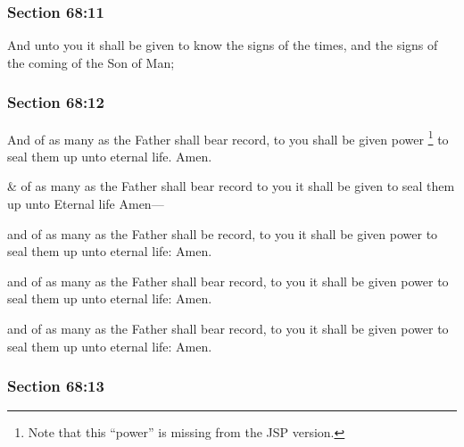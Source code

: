 	\subsubsection{Section 68:11} %
		\label{DC68-11}

		And unto you it shall be given to know the signs of the times, and the signs of the coming of the Son of Man;


	\subsubsection{Section 68:12} %
		\label{DC68-12}

		And of as many as the Father shall bear record, to you shall be given power%
			\footnote{%
				Note that this ``power'' is missing from the JSP version.
				}
		to seal them up unto eternal life.  Amen.

		\begin{framed}
		\scriptsize
			\begin{compactdesc}
				\item[JSP] \& of as many as the Father shall bear record to you it shall be given to seal them up unto Eternal life Amen---
				\item[EMS] and of as many as the Father shall be record, to you it shall be given power to seal them up unto eternal life: Amen.
				\item[EMS-R] and of as many as the Father shall bear record, to you it shall be given power to seal them up unto eternal life: Amen.
				\item[DC 1835] and of as many as the Father shall bear record, to you it shall be given power to seal them up unto eternal life: Amen.
			\end{compactdesc}
		\end{framed}

	\subsubsection{Section 68:13} %
		\label{DC68-13}

